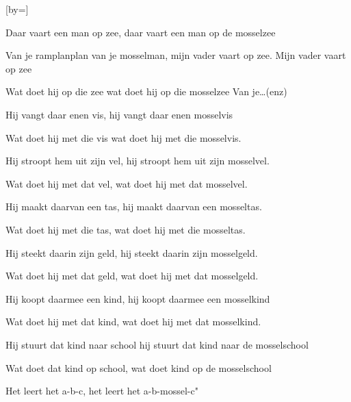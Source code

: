  

[by=]




\beginverse
Daar vaart een man op zee,
 daar vaart een man op de mosselzee
\endverse

\beginchorus
        Van je ramplanplan van je mosselman,
        mijn vader vaart op zee.
        Mijn vader vaart op zee
\endchorus

\beginverse
    Wat doet hij op die zee
    wat doet hij op die mosselzee
    Van je…(enz)
\endverse

\beginverse
    Hij vangt daar enen vis,
    hij vangt daar enen mosselvis
\endverse

\beginverse
    Wat doet hij met die vis
    wat doet hij met die mosselvis.
\endverse

\beginverse
    Hij stroopt hem uit zijn vel,
    hij stroopt hem uit zijn mosselvel.
\endverse

\beginverse
    Wat doet hij met dat vel,
    wat doet hij met dat mosselvel.
\endverse

\beginverse
    Hij maakt daarvan een tas,
    hij maakt daarvan een mosseltas.
\endverse

\beginverse
    Wat doet hij met die tas,
    wat doet hij met die mosseltas.
\endverse

\beginverse
    Hij steekt daarin zijn geld,
    hij steekt daarin zijn mosselgeld.
\endverse

\beginverse
    Wat doet hij met dat geld,
    wat doet hij met dat mosselgeld.
\endverse

\beginverse
    Hij koopt daarmee een kind,
    hij koopt daarmee een mosselkind
\endverse

\beginverse
    Wat doet hij met dat kind,
    wat doet hij met dat mosselkind.
\endverse

\beginverse
    Hij stuurt dat kind naar school
    hij stuurt dat kind naar de mosselschool
\endverse

\beginverse
    Wat doet dat kind op school,
    wat doet kind op de mosselschool
\endverse

\beginverse
Het leert het a-b-c,
 het leert het a-b-mossel-c" 
\endverse




\endsong
